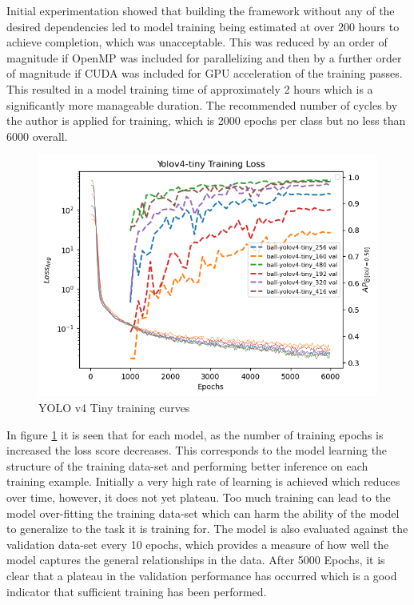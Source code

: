 \documentclass[a4paper,twoside,12pt]{report}
\begin{document}
Initial experimentation showed that building the framework without any of the desired dependencies led to model training being estimated at over 200 hours to achieve completion, which was unacceptable. This was reduced by an order of magnitude if OpenMP was included for parallelizing and then by a further order of magnitude if CUDA was included for GPU acceleration of the training passes. This resulted in a model training time of approximately 2 hours which is a significantly more manageable duration. The recommended number of cycles by the author is applied for training, which is 2000 epochs per class but no less than 6000 overall.

\begin{figure}[h!]
\begin{center}
\includegraphics[width=13cm]{images/yolov4tiny_train.png}
\caption{YOLO v4 Tiny training curves}
\label{fig:yolov4tiny_train}
\end{center}
\end{figure}

In figure \ref{fig:yolov4tiny_train} it is seen that for each model, as the number of training epochs is increased the loss score decreases. This corresponds to the model learning the structure of the training data-set and performing better inference on each training example. Initially a very high rate of learning is achieved which reduces over time, however, it does not yet plateau. Too much training can lead to the model over-fitting the training data-set which can harm the ability of the model to generalize to the task it is training for. The model is also evaluated against the validation data-set every 10 epochs, which provides a measure of how well the model captures the general relationships in the data. After 5000 Epochs, it is clear that a plateau in the validation performance has occurred which is a good indicator that sufficient training has been performed. 
\end{document}
